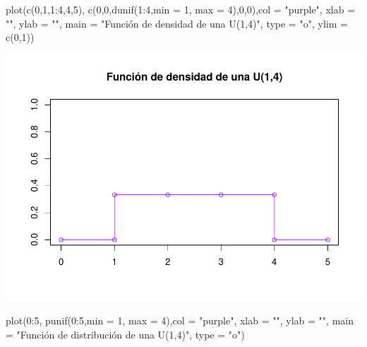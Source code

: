 \documentclass[
]{article}
\newenvironment{Shaded}{\begin{snugshade}}{\end{snugshade}}
\newcommand{\AttributeTok}[1]{\textcolor[rgb]{0.77,0.63,0.00}{#1}}
\newcommand{\DecValTok}[1]{\textcolor[rgb]{0.00,0.00,0.81}{#1}}
\newcommand{\FunctionTok}[1]{\textcolor[rgb]{0.00,0.00,0.00}{#1}}
\newcommand{\NormalTok}[1]{#1}
\newcommand{\SpecialCharTok}[1]{\textcolor[rgb]{0.00,0.00,0.00}{#1}}
\newcommand{\StringTok}[1]{\textcolor[rgb]{0.31,0.60,0.02}{#1}}
\begin{document}
\begin{Shaded}
\begin{Highlighting}[]
\FunctionTok{plot}\NormalTok{(}\FunctionTok{c}\NormalTok{(}\DecValTok{0}\NormalTok{,}\DecValTok{1}\NormalTok{,}\DecValTok{1}\SpecialCharTok{:}\DecValTok{4}\NormalTok{,}\DecValTok{4}\NormalTok{,}\DecValTok{5}\NormalTok{), }\FunctionTok{c}\NormalTok{(}\DecValTok{0}\NormalTok{,}\DecValTok{0}\NormalTok{,}\FunctionTok{dunif}\NormalTok{(}\DecValTok{1}\SpecialCharTok{:}\DecValTok{4}\NormalTok{,}\AttributeTok{min =} \DecValTok{1}\NormalTok{, }\AttributeTok{max =} \DecValTok{4}\NormalTok{),}\DecValTok{0}\NormalTok{,}\DecValTok{0}\NormalTok{),}\AttributeTok{col =} \StringTok{"purple"}\NormalTok{, }\AttributeTok{xlab =} \StringTok{""}\NormalTok{, }\AttributeTok{ylab =} \StringTok{""}\NormalTok{, }\AttributeTok{main =} \StringTok{"Función de densidad de una U(1,4)"}\NormalTok{, }\AttributeTok{type =} \StringTok{"o"}\NormalTok{, }\AttributeTok{ylim =} \FunctionTok{c}\NormalTok{(}\DecValTok{0}\NormalTok{,}\DecValTok{1}\NormalTok{))}
\end{Highlighting}
\end{Shaded}

\includegraphics{Teoria4_files/figure-latex/Distribucion uniforme-1.pdf}

\begin{Shaded}
\begin{Highlighting}[]
\FunctionTok{plot}\NormalTok{(}\DecValTok{0}\SpecialCharTok{:}\DecValTok{5}\NormalTok{, }\FunctionTok{punif}\NormalTok{(}\DecValTok{0}\SpecialCharTok{:}\DecValTok{5}\NormalTok{,}\AttributeTok{min =} \DecValTok{1}\NormalTok{, }\AttributeTok{max =} \DecValTok{4}\NormalTok{),}\AttributeTok{col =} \StringTok{"purple"}\NormalTok{, }\AttributeTok{xlab =} \StringTok{""}\NormalTok{, }\AttributeTok{ylab =} \StringTok{""}\NormalTok{, }\AttributeTok{main =} \StringTok{"Función de distribución de una U(1,4)"}\NormalTok{, }\AttributeTok{type =} \StringTok{"o"}\NormalTok{)}
\end{Highlighting}
\end{Shaded}
\end{document}
